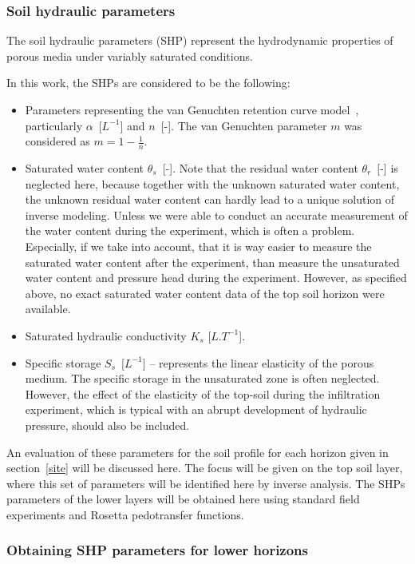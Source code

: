 \documentclass[review]{myarticle}
\begin{document}
\subsubsection{Soil hydraulic parameters}
\label{shp}

The soil hydraulic parameters (SHP) represent the hydrodynamic properties of porous media under variably saturated conditions.

In this work, the SHPs are considered to be the following:

\begin{itemize}
\item Parameters representing the van Genuchten retention curve model~\citep{vangenuchten}, particularly $\alpha$~[$L^{-1}$]  and $n$~[-]. The van Genuchten parameter $m$ was considered as $m=1-\frac{1}{n}$. 
\item Saturated water content $\theta_s$~[-]. Note that the residual water content $\theta_r$~[-] is neglected here, because together with the unknown saturated water content, the unknown residual water content can hardly lead to a unique solution of inverse modeling. Unless we were able to conduct an accurate measurement of the water content during the experiment, which is often a problem. Especially, if we take into account, that it is way easier to measure the saturated water content after the experiment, than measure the unsaturated water content and pressure head during the experiment. However, as specified above, no exact saturated water content data of the top soil horizon were available.
\item Saturated hydraulic conductivity $K_s$ [$L.T^{-1}$]. 
\item Specific storage $S_s$~[$L^{-1}$] -- represents the linear elasticity of the porous medium. The specific storage in the unsaturated zone is often neglected. However, the effect of the elasticity of the top-soil during the infiltration experiment, which is typical with an abrupt development of hydraulic pressure, should also be included.
\end{itemize}

An evaluation of these parameters for the soil profile for each horizon given in section~\ref{site} will be discussed here. The focus will be given on the top soil layer, where this set of parameters will be identified here by  inverse analysis. The SHPs parameters of the lower layers will be obtained here using standard field experiments  and Rosetta pedotransfer functions.


\subsubsection{Obtaining SHP parameters for lower horizons}
\label{dolni}
\end{document}
